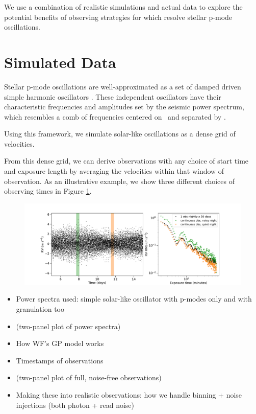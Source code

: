 \documentclass[modern]{aastex62}
\begin{document}
We use a combination of realistic simulations and actual \EXPRES data to explore the potential benefits of observing strategies for \EPRV which resolve stellar p-mode oscillations. 


\section{Simulated Data}

Stellar p-mode oscillations are well-approximated as a set of damped driven simple harmonic oscillators . 
These independent oscillators have their characteristic frequencies and amplitudes set by the seismic power spectrum, which resembles a comb of frequencies centered on \numax\ and separated by \deltanu.

Using this framework, we simulate solar-like oscillations as a dense grid of velocities. 

From this dense grid, we can derive \RV observations with any choice of start time and exposure length by averaging the velocities within that window of observation. 
As an illustrative example, we show three different choices of observing times in Figure \ref{fig:binning-sim}. 

\begin{figure}
    \centering
    \includegraphics{figures/binning_test.pdf}
    \caption{}
    \label{fig:binning-sim}
\end{figure}




\begin{itemize}
\item Power spectra used: simple solar-like oscillator with p-modes only and with granulation too
\item (two-panel plot of power spectra)
\item How WF's GP model works
\item Timestamps of observations
\item (two-panel plot of full, noise-free observations)
\item Making these into realistic observations: how we handle binning + noise injections (both photon + read noise)
\end{itemize}
\end{document}
